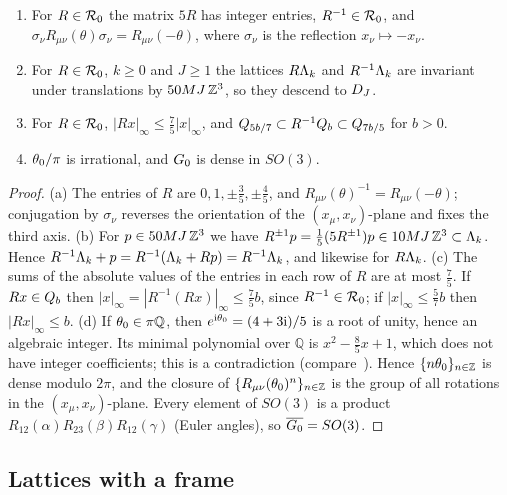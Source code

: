 \begin{lemma}\label{rot:lem:geom}
\begin{enumerate}[label=\textup{(\alph*)},leftmargin=*]
\item For $R\in\mathcal R_0$ the matrix $5R$ has integer entries, $R^{-1}\in\mathcal R_0$, and $\sigma_\nu R_{\mu\nu}(\theta)\sigma_\nu=R_{\mu\nu}(-\theta)$, where $\sigma_\nu$ is the reflection $x_\nu\mapsto-x_\nu$.
\item For $R\in\mathcal R_0$, $k\ge0$ and $J\ge1$ the lattices $R\Lambda_k$ and $R^{-1}\Lambda_k$ are invariant under translations by $50MJ\,\mathbb Z^3$, so they descend to $D_J$.
\item For $R\in\mathcal R_0$, $|Rx|_\infty\le\frac75|x|_\infty$, and $Q_{5b/7}\subset R^{-1}Q_{b}\subset Q_{7b/5}$ for $b>0$.
\item $\theta_0/\pi$ is irrational, and $G_0$ is dense in $SO(3)$.
\end{enumerate}
\end{lemma}

\begin{proof}
(a) The entries of $R$ are $0,1,\pm\frac35,\pm\frac45$, and $R_{\mu\nu}(\theta)^{-1}=R_{\mu\nu}(-\theta)$; conjugation by $\sigma_\nu$ reverses the orientation of the $(x_\mu,x_\nu)$-plane and fixes the third axis.
(b) For $p\in50MJ\,\mathbb Z^3$ we have $R^{\pm1}p=\frac15(5R^{\pm1})p\in10MJ\,\mathbb Z^3\subset\Lambda_k$. Hence $R^{-1}\Lambda_k+p=R^{-1}(\Lambda_k+Rp)=R^{-1}\Lambda_k$, and likewise for $R\Lambda_k$.
(c) The sums of the absolute values of the entries in each row of $R$ are at most $\frac75$. If $Rx\in Q_{b}$ then $|x|_\infty=|R^{-1}(Rx)|_\infty\le\frac75b$, since $R^{-1}\in\mathcal R_0$; if $|x|_\infty\le\frac57b$ then $|Rx|_\infty\le b$.
(d) If $\theta_0\in\pi\mathbb Q$, then $e^{\mathrm i\theta_0}=(4+3\mathrm i)/5$ is a root of unity, hence an algebraic integer. Its minimal polynomial over $\mathbb Q$ is $x^2-\frac85x+1$, which does not have integer coefficients; this is a contradiction (compare~\cite[pp.~337--338]{K2}). Hence $\{n\theta_0\}_{n\in\mathbb Z}$ is dense modulo $2\pi$, and the closure of $\{R_{\mu\nu}(\theta_0)^n\}_{n\in\mathbb Z}$ is the group of all rotations in the $(x_\mu,x_\nu)$-plane. Every element of $SO(3)$ is a product $R_{12}(\alpha)R_{23}(\beta)R_{12}(\gamma)$ (Euler angles), so $\overline{G_0}=SO(3)$.
\end{proof}

\subsection{Lattices with a frame}

